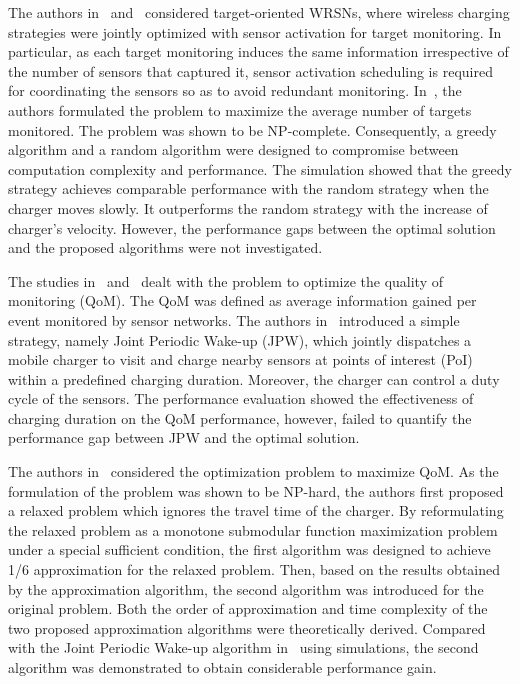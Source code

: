 \documentclass[twocolumn,10pt]{IEEEtran}
\begin{document}
The authors in~\cite{J2014Wang} and~\cite{H2013Dai} considered target-oriented WRSNs, where wireless charging strategies were jointly optimized with sensor activation for target monitoring. In particular, as each target monitoring induces the same information irrespective of the number of sensors that captured it, sensor activation scheduling is required for coordinating the sensors so as to avoid redundant monitoring. In~\cite{J2014Wang}, the authors formulated the problem to maximize the average number of targets monitored. The problem was shown to be NP-complete. Consequently, a greedy algorithm and a random algorithm were designed to compromise between computation complexity and performance. The simulation showed that the greedy strategy achieves comparable performance with the random strategy when the charger moves slowly. It outperforms the random strategy with the increase of charger's velocity. However, the performance gaps between the optimal solution and the proposed algorithms were not investigated.

The studies in~\cite{H2013Dai} and~\cite{F.2011Jiang} dealt with the problem to optimize the quality of monitoring (QoM). The QoM was defined as average information gained per event monitored by sensor networks. The authors in~\cite{F.2011Jiang} introduced a simple strategy, namely Joint Periodic Wake-up (JPW), which jointly dispatches a mobile charger to visit and charge nearby sensors at points of interest (PoI) within a predefined charging duration. Moreover, the charger can control a duty cycle of the sensors. The performance evaluation showed the effectiveness of charging duration on the QoM performance, however, failed to quantify the performance gap between JPW and the optimal solution. 

The authors in~\cite{H2013Dai} considered the optimization problem to maximize QoM. As the formulation of the problem was shown to be NP-hard, the authors first proposed a relaxed problem which ignores the travel time of the charger. By reformulating the relaxed problem as a monotone submodular function maximization problem under a special sufficient condition, the first algorithm was designed to achieve 1/6 approximation for the relaxed problem. Then, based on the results obtained by the approximation algorithm, the second algorithm was introduced for the original problem. Both the order of approximation and time complexity of the two proposed approximation algorithms were theoretically derived. Compared with the Joint Periodic Wake-up algorithm in~\cite{F.2011Jiang} using simulations, the second algorithm was demonstrated to obtain considerable performance gain.
\end{document}
